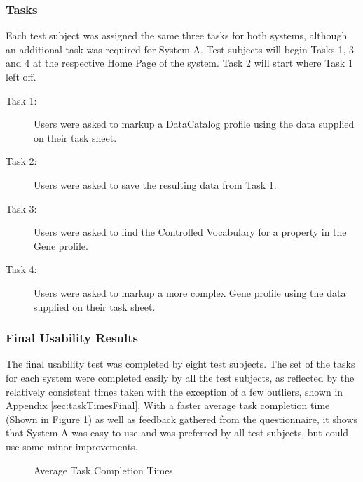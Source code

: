 \subsubsection{Tasks}
Each test subject was assigned the same three tasks for both systems, although an additional task was required for System A. Test subjects will begin Tasks 1, 3 and 4 at the respective Home Page of the system. Task 2 will start where Task 1 left off.

\begin{description}
  \item[Task 1:] Users were asked to markup a DataCatalog profile using the data supplied on their task sheet.
  \item[Task 2:] Users were asked to save the resulting data from Task 1.
  \item[Task 3:] Users were asked to find the Controlled Vocabulary for a property in the Gene profile.
  \item[Task 4:] Users were asked to markup a more complex Gene profile using the data supplied on their task sheet.
\end{description}

\subsubsection{Final Usability Results}\label{sec:finalUsabilityResults}
The final usability test was completed by eight test subjects. The set of the tasks for each system were completed easily by all the test subjects, as reflected by the relatively consistent times taken with the exception of a few outliers, shown in Appendix \ref{sec:taskTimesFinal}. With a faster average task completion time (Shown in Figure \ref{fig:averageTask}) as well as feedback gathered from the questionnaire, it shows that System A was easy to use and was preferred by all test subjects, but could use some minor improvements. \newline

\begin{figure}[!h]
  \centering
  \begin{minipage}[b]{0.6\textwidth}
    \caption{Average Task Completion Times}
    \label{fig:averageTask}
  \end{minipage}
\end{figure}

